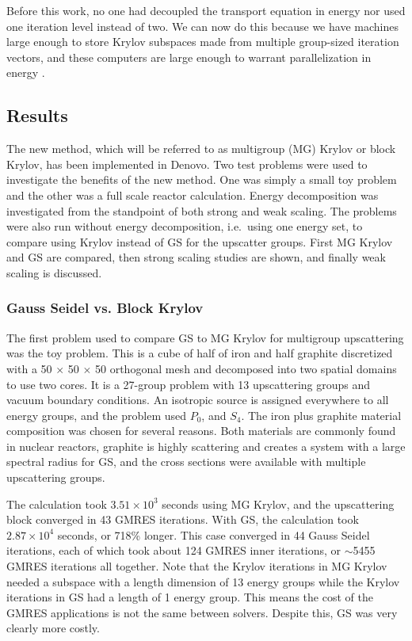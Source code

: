 Before this work, no one had decoupled the transport equation in energy nor used one iteration level instead of two. We can now do this because we have machines large enough to store Krylov subspaces made from multiple group-sized iteration vectors, and these computers are large enough to warrant parallelization in energy . 

\subsection{Results}
The new method, which will be referred to as multigroup (MG) Krylov or block Krylov, has been implemented in Denovo. Two test problems were used to investigate the benefits of the new method. One was simply a small toy problem and the other was a full scale reactor calculation. Energy decomposition was investigated from the standpoint of both strong and weak scaling. The problems were also run without energy decomposition, i.e.\ using one energy set, to compare using Krylov instead of GS for the upscatter groups. First MG Krylov and GS are compared, then strong scaling studies are shown, and finally weak scaling is discussed.

\subsubsection{Gauss Seidel vs. Block Krylov}
The first problem used to compare GS to MG Krylov for multigroup upscattering was the toy problem. This is a cube of half of iron and half graphite discretized with a 50 $\times$ 50 $\times$ 50 orthogonal mesh and decomposed into two spatial domains to use two cores. It is a 27-group problem with 13 upscattering groups and vacuum boundary conditions. An isotropic source is assigned everywhere to all energy groups, and the problem used $P_0$, and $S_4$. The iron plus graphite material composition was chosen for several reasons. Both materials are commonly found in nuclear reactors, graphite is highly scattering and creates a system with a large spectral radius for GS, and the cross sections were available with multiple upscattering groups.

The calculation took $3.51 \times 10^{3}$ seconds using MG Krylov, and the upscattering block converged in 43 GMRES iterations. With GS, the calculation took $2.87 \times 10^{4}$ seconds, or 718\% longer. This case converged in 44 Gauss Seidel iterations, each of which took about 124 GMRES inner iterations, or $\sim$5455 GMRES iterations all together. Note that the Krylov iterations in MG Krylov needed a subspace with a length dimension of 13 energy groups while the Krylov iterations in GS had a length of 1 energy group. This means the cost of the GMRES applications is not the same between solvers. Despite this, GS was very clearly more costly.

